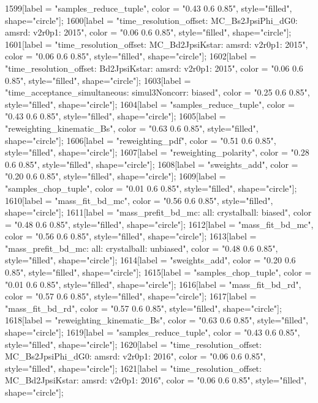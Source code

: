 {	1599[label = "samples_reduce_tuple", color = "0.43 0.6 0.85", style="filled", shape="circle"];
	1600[label = "time_resolution_offset\nmode: MC_Bs2JpsiPhi_dG0\ntimeres: amsrd\nversion: v2r0p1\nyear: 2015", color = "0.06 0.6 0.85", style="filled", shape="circle"];
	1601[label = "time_resolution_offset\nmode: MC_Bd2JpsiKstar\ntimeres: amsrd\nversion: v2r0p1\nyear: 2015", color = "0.06 0.6 0.85", style="filled", shape="circle"];
	1602[label = "time_resolution_offset\nmode: Bd2JpsiKstar\ntimeres: amsrd\nversion: v2r0p1\nyear: 2015", color = "0.06 0.6 0.85", style="filled", shape="circle"];
	1603[label = "time_acceptance_simultaneous\ntimeacc: simul3Noncorr\ntrigger: biased", color = "0.25 0.6 0.85", style="filled", shape="circle"];
	1604[label = "samples_reduce_tuple", color = "0.43 0.6 0.85", style="filled", shape="circle"];
	1605[label = "reweighting_kinematic_Bs", color = "0.63 0.6 0.85", style="filled", shape="circle"];
	1606[label = "reweighting_pdf", color = "0.51 0.6 0.85", style="filled", shape="circle"];
	1607[label = "reweighting_polarity", color = "0.28 0.6 0.85", style="filled", shape="circle"];
	1608[label = "sweights_add", color = "0.20 0.6 0.85", style="filled", shape="circle"];
	1609[label = "samples_chop_tuple", color = "0.01 0.6 0.85", style="filled", shape="circle"];
	1610[label = "mass_fit_bd_mc", color = "0.56 0.6 0.85", style="filled", shape="circle"];
	1611[label = "mass_prefit_bd_mc\nmassbin: all\nmassmodel: crystalball\ntrigger: biased", color = "0.48 0.6 0.85", style="filled", shape="circle"];
	1612[label = "mass_fit_bd_mc", color = "0.56 0.6 0.85", style="filled", shape="circle"];
	1613[label = "mass_prefit_bd_mc\nmassbin: all\nmassmodel: crystalball\ntrigger: unbiased", color = "0.48 0.6 0.85", style="filled", shape="circle"];
	1614[label = "sweights_add", color = "0.20 0.6 0.85", style="filled", shape="circle"];
	1615[label = "samples_chop_tuple", color = "0.01 0.6 0.85", style="filled", shape="circle"];
	1616[label = "mass_fit_bd_rd", color = "0.57 0.6 0.85", style="filled", shape="circle"];
	1617[label = "mass_fit_bd_rd", color = "0.57 0.6 0.85", style="filled", shape="circle"];
	1618[label = "reweighting_kinematic_Bs", color = "0.63 0.6 0.85", style="filled", shape="circle"];
	1619[label = "samples_reduce_tuple", color = "0.43 0.6 0.85", style="filled", shape="circle"];
	1620[label = "time_resolution_offset\nmode: MC_Bs2JpsiPhi_dG0\ntimeres: amsrd\nversion: v2r0p1\nyear: 2016", color = "0.06 0.6 0.85", style="filled", shape="circle"];
	1621[label = "time_resolution_offset\nmode: MC_Bd2JpsiKstar\ntimeres: amsrd\nversion: v2r0p1\nyear: 2016", color = "0.06 0.6 0.85", style="filled", shape="circle"];
}
